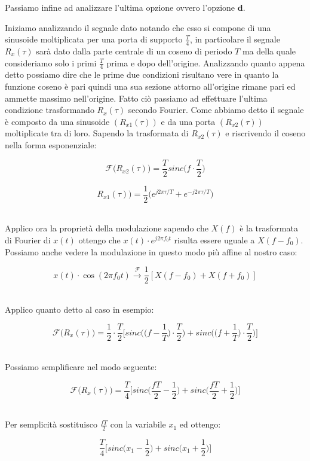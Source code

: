 \documentclass[../main.tex]{subfiles}
\begin{document}
Passiamo infine ad analizzare l'ultima opzione ovvero l'opzione $\textbf{d}$. 

Iniziamo analizzando il segnale dato notando che esso si compone di una sinusoide moltiplicata per una porta di supporto $\tfrac{T}{4}$, in particolare il segnale $R_x(\tau)$ sarà dato dalla parte centrale di un coseno di periodo $T$ ma della quale consideriamo solo i primi $\tfrac{T}{4}$ prima e dopo dell'origine.
Analizzando quanto appena detto possiamo dire che le prime due condizioni risultano vere in quanto la funzione coseno è pari quindi una sua sezione attorno all'origine rimane pari ed ammette massimo nell'origine.
Fatto ciò passiamo ad effettuare l'ultima condizione trasformando $R_x(\tau)$ secondo Fourier. 
Come abbiamo detto il segnale è composto da una sinusoide $(R_{x1}(\tau))$ e da una porta $(R_{x2}(\tau))$ moltiplicate tra di loro.
Sapendo la trasformata di $R_{x2}(\tau)$ e riscrivendo il coseno nella forma esponenziale:

\[ \mathcal{F}\big( R_{x2}(\tau)  \big) =  \frac{T}{2} \unit{sinc}\bigg(f \cdot \frac{T}{2}\bigg)\]

\[  R_{x1}(\tau)  \big) = \frac{1}{2} \big(e^{j2\pi \tau / T} + e^{-j2\pi \tau / T}\big) \]\

Applico ora la proprietà della modulazione sapendo che $X(f)$ è la trasformata di Fourier di $x(t)$ ottengo che $x(t) \cdot e^{j2\pi f_0 t}$ risulta essere uguale a $X(f - f_0)$.
Possiamo anche vedere la modulazione in questo modo più affine al nostro caso:

\[ x(t) \cdot \cos(2\pi f_0t) \xrightarrow{\mathcal{F}} \frac{1}{2} [X(f - f_0) + X(f + f_0)]\]\

Applico quanto detto al caso in esempio:

\[ \mathcal{F} \big( R_x(\tau)\big) = \frac{1}{2} \cdot \frac{T}{2} \bigg[ \unit{sinc} \bigg( \bigg(f - \dfrac{1}{T}\bigg) \cdot \frac{T}{2}  \bigg) + \unit{sinc} \bigg( \bigg(f + \dfrac{1}{T}\bigg) \cdot \frac{T}{2}  \bigg)    \bigg]  \]\

Possiamo semplificare nel modo seguente:

\[\mathcal{F} \big( R_x(\tau)\big) = \frac{T}{4} \bigg[  \unit{sinc}\bigg( \frac{fT}{2} - \frac{1}{2} \bigg)  + \unit{sinc}\bigg( \frac{fT}{2} + \frac{1}{2} \bigg)\bigg]     \]\

Per semplicità sostituisco $\tfrac{fT}{2}$ con la variabile $x_1$ ed ottengo:

\[ \frac{T}{4} \big[  \unit{sinc}\big( x_1 - \frac{1}{2} \big)  + \unit{sinc}\big( x_1+ \frac{1}{2} \big)\big]     \]\
\end{document}
